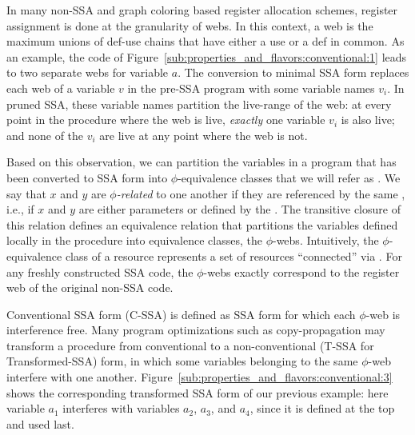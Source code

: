 In many non-SSA and graph coloring based register allocation schemes, register assignment is done at the granularity of webs. 
In this context, a web is the maximum unions of def-use chains that have either a use or a def in common. 
As an example, the code of Figure~\ref{sub:properties_and_flavors:conventional:1} leads to two separate webs for variable $a$. 
The conversion to minimal SSA form replaces each web of a variable $v$ in the pre-SSA program with some variable names $v_i$. 
In pruned SSA, these variable names partition the live-range of the web: 
at every point in the procedure where the web is live, \emph{exactly} one variable $v_{i}$ is also live; 
and none of the $v_{i}$ are live at any point where the web is not.


Based on this observation, we can partition the variables in a program that has been converted to SSA form into $\phi$-equivalence classes that we will refer as \phiwebs.\index{\phiweb} We say that $x$ and $y$ are \emph{$\phi$-related} to one another if they are referenced by the same \phifun, i.e., if $x$ and $y$ are either parameters or defined by the \phifun. 
The transitive closure of this relation defines an equivalence relation that partitions the variables defined locally in the procedure into equivalence classes, the $\phi$-webs. 
Intuitively, the $\phi$-equivalence class of a resource represents a set of resources ``connected'' via \phifuns. 
For any freshly constructed SSA code, the $\phi$-webs exactly correspond to the register web of the original non-SSA code.

Conventional SSA form (C-SSA) is defined as SSA form for which each $\phi$-web is interference free. 
Many program optimizations such as copy-propagation may transform a procedure from conventional to a non-conventional (T-SSA for Transformed-SSA) form, in which some variables belonging to the same $\phi$-web interfere with one another. 
Figure~\ref{sub:properties_and_flavors:conventional:3} shows the corresponding transformed SSA form of our previous example: 
here variable $a_1$ interferes with variables $a_2$, $a_3$, and $a_4$, since it is defined at the top and used last.

